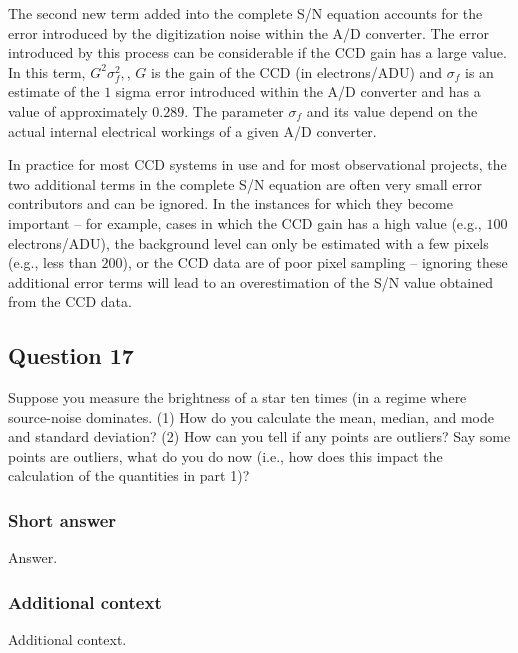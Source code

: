\documentclass[a4paper,10pt]{article}
\begin{document}
{\noindent}The second new term added into the complete S/N equation accounts for the error introduced by the digitization noise within the A/D converter. The error introduced by this process can be considerable if the CCD gain has a large value. In this term, $G^2\sigma_f^2,$, $G$ is the gain of the CCD (in electrons/ADU) and $\sigma_f$ is an estimate of the $1$ sigma error introduced within the A/D converter and has a value of approximately $0.289$. The parameter $\sigma_f$ and its value depend on the actual internal electrical workings of a given A/D converter.

{\noindent}In practice for most CCD systems in use and for most observational projects, the two additional terms in the complete S/N equation are often very small error contributors and can be ignored. In the instances for which they become important -- for example, cases in which the CCD gain has a high value (e.g., $100$ electrons/ADU), the background level can only be estimated with a few pixels (e.g., less than $200$), or the CCD data are of poor pixel sampling -- ignoring these additional error terms will lead to an overestimation of the S/N value obtained from the CCD data.


\newpage
\subsection{Question 17}

Suppose you measure the brightness of a star ten times (in a regime where source-noise dominates. (1) How do you calculate the mean, median, and mode and standard deviation? (2) How can you tell if any points are outliers? Say some points are outliers, what do you do now (i.e., how does this impact the calculation of the quantities in part 1)?

\subsubsection{Short answer}

Answer.

\subsubsection{Additional context}

Additional context.
\end{document}
